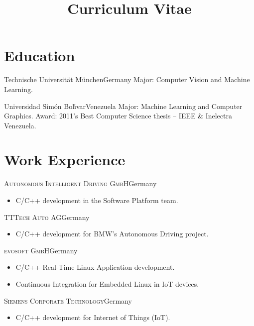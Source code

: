 \documentclass[10pt]{moderncv}
\title{Curriculum Vitae}
\begin{document}
\maketitle

\section{Education}

  {Technische Universit\"at M\"unchen}{Germany}{}{%
    Major: Computer Vision and Machine Learning.
  }

  {Universidad Sim\'on Bol\'{\i}var}{Venezuela}{}{%
    Major: Machine Learning and Computer Graphics.
    \newline
    Award: 2011's Best Computer Science thesis -- IEEE \& Inelectra Venezuela.
  }

\section{Work Experience}


{\textsc{Autonomous Intelligent Driving GmbH}}{Germany}{}{%
\begin{itemize}
    \item C/C++ development in the Software Platform team.
\end{itemize}
}

{\textsc{TTTech Auto AG}}{Germany}{}{%
\begin{itemize}
    \item C/C++ development for BMW's Autonomous Driving project.
\end{itemize}
}

{\textsc{evosoft GmbH}}{Germany}{}{%
\begin{itemize}
    \item C/C++ Real-Time Linux Application development.
    \item Continuous Integration for Embedded Linux in IoT devices.
\end{itemize}
}

{\textsc{Siemens Corporate Technology}}{Germany}{}{%
\begin{itemize}
  \item C/C++ development for Internet of Things (IoT).
\end{itemize}
}
\end{document}
